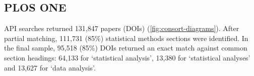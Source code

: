 \documentclass[12pt]{article}
\begin{document}

\subsection{PLOS ONE}\label{plos-one}

API searches returned 131,847 papers (DOIs)
(\autoref{fig:consort-diagrams}). After partial matching, 111,731 (85\%)
statistical methods sections were identified. In the final sample,
95,518 (85\%) DOIs returned an exact match against common section
headings: 64,133 for `statistical analysis', 13,380 for `statistical
analyses' and 13,627 for `data analysis'.
\end{document}
